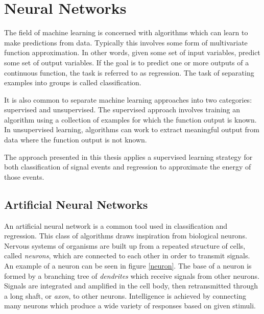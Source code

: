 \chapter{Neural Networks}
\label{nnet_chapter}

The field of machine learning is concerned with algorithms which can learn to make predictions from data.  Typically this involves some form of multivariate function approximation.  In other words, given some set of input variables, predict some set of output variables.  If the goal is to predict one or more outputs of a continuous function, the task is referred to as regression.  The task of separating examples into groups is called classification.

It is also common to separate machine learning approaches into two categories: supervised and unsupervised.  The supervised approach involves training an algorithm using a collection of examples for which the function output is known.  In unsupervised learning, algorithms can work to extract meaningful output from data where the function output is not known.

The approach presented in this thesis applies a supervised learning strategy for both classification of signal events and regression to approximate the energy of those events.



\section{Artificial Neural Networks}

An artificial neural network is a common tool used in classification and regression.  This class of algorithms draws inspiration from biological neurons.  Nervous systems of organisms are built up from a repeated structure of cells, called \textit{neurons}, which are connected to each other in order to transmit signals.  An example of a neuron can be seen in figure \ref{neuron}.  The base of a neuron is formed by a branching tree of \textit{dendrites} which receive signals from other neurons.  Signals are integrated and amplified in the cell body, then retransmitted through a long shaft, or \textit{axon}, to other neurons.  Intelligence is achieved by connecting many neurons which produce a wide variety of responses based on given stimuli.


